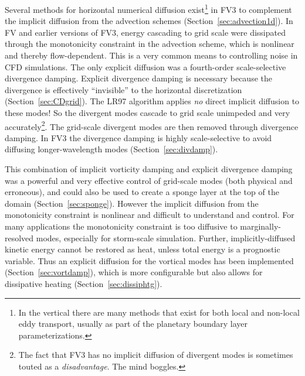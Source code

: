 \documentclass[10pt,letterpaper,margin=1in]{memoir}
\begin{document}
Several methods for horizontal numerical diffusion exist\footnote{In the vertical there are many methods that exist for both local and non-local eddy transport, usually as part of the planetary boundary layer parameterizations.} in FV3 to complement the implicit diffusion from the advection schemes (Section~\ref{sec:advection1d}). In FV and earlier versions of FV3, energy cascading to grid scale were dissipated through the monotonicity constraint in the advection scheme, which is nonlinear and thereby flow-dependent. This is a very common means to controlling noise in CFD simulations. The only explicit diffusion was a fourth-order scale-selective divergence damping. Explicit divergence damping is necessary because the divergence is effectively ``invisible'' to the horizontal discretization (Section~\ref{sec:CDgrid}). The LR97 algorithm  applies \textit{no} direct implicit diffusion to these modes! So the divergent modes cascade to grid scale unimpeded and very accurately\footnote{The fact that FV3 has no implicit diffusion of divergent modes is sometimes touted as a \textit{disadvantage}. The mind boggles.}. The grid-scale divergent modes are then removed through divergence damping. In FV3 the divergence damping is highly scale-selective to avoid diffusing longer-wavelength modes (Section~\ref{sec:divdamp}). 

This combination of implicit vorticity damping and explicit divergence damping was a powerful and very effective control of grid-scale modes (both physical and erroneous), and could also be used to create a sponge layer at the top of the domain (Section~\ref{sec:sponge}). However the implicit diffusion from the monotonicity constraint is nonlinear and difficult to understand and control. For many applications the monotonicity constraint is too diffusive to marginally-resolved modes, especially for storm-scale simulation. Further, implicitly-diffused kinetic energy cannot be restored as heat, unless total energy is a prognostic variable. Thus an explicit diffusion for the vortical modes has been implemented (Section~\ref{sec:vortdamp}), which is more configurable but also allows for dissipative heating (Section~\ref{sec:dissiphtg}). 
\end{document}
